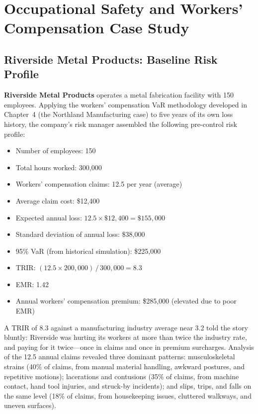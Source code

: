 \documentclass[11pt,openany]{book}
\providecommand{\tightlist}{\setlength{\itemsep}{0pt}\setlength{\parskip}{0pt}}
\begin{document}
\section{Occupational Safety and Workers' Compensation Case Study}
\label{sec:riverside-case}

\subsection{Riverside Metal Products: Baseline Risk Profile}

\textbf{Riverside Metal Products} operates a metal fabrication facility with
150 employees. Applying the workers' compensation VaR methodology developed in
Chapter~4 (the Northland Manufacturing case) to five years of its own loss
history, the company's risk manager assembled the following pre-control risk
profile:

\begin{itemize}\tightlist
  \item Number of employees: 150
  \item Total hours worked: 300{,}000
  \item Workers' compensation claims: 12.5 per year (average)
  \item Average claim cost: \$12{,}400
  \item Expected annual loss: \(12.5 \times \$12{,}400 = \$155{,}000\)
  \item Standard deviation of annual loss: \$38{,}000
  \item 95\% VaR (from historical simulation): \$225{,}000
  \item TRIR: \((12.5 \times 200{,}000)\,/\,300{,}000 = 8.3\)
  \item EMR: 1.42
  \item Annual workers' compensation premium: \$285{,}000 (elevated due to
        poor EMR)
\end{itemize}

A TRIR of 8.3 against a manufacturing industry average near 3.2 told the story
bluntly: Riverside was hurting its workers at more than twice the industry
rate, and paying for it twice---once in claims and once in premium surcharges.
Analysis of the 12.5 annual claims revealed three dominant patterns:
musculoskeletal strains (40\% of claims, from manual material handling,
awkward postures, and repetitive motions); lacerations and contusions (35\% of
claims, from machine contact, hand tool injuries, and struck-by incidents);
and slips, trips, and falls on the same level (18\% of claims, from
housekeeping issues, cluttered walkways, and uneven surfaces).
\end{document}
